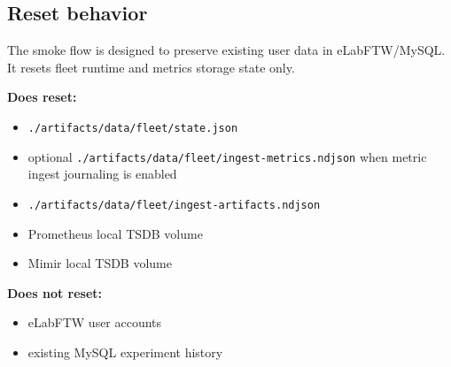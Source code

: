 \documentclass[11pt,a4paper]{article}
\begin{document}
\subsection{Reset behavior}
The smoke flow is designed to preserve existing user data in eLabFTW/MySQL.
It resets fleet runtime and metrics storage state only.

\textbf{Does reset:}
\begin{itemize}
  \item \texttt{./artifacts/data/fleet/state.json}
  \item optional \texttt{./artifacts/data/fleet/ingest-metrics.ndjson} when metric ingest journaling is enabled
  \item \texttt{./artifacts/data/fleet/ingest-artifacts.ndjson}
  \item Prometheus local TSDB volume
  \item Mimir local TSDB volume
\end{itemize}

\textbf{Does not reset:}
\begin{itemize}
  \item eLabFTW user accounts
  \item existing MySQL experiment history
\end{itemize}
\end{document}
